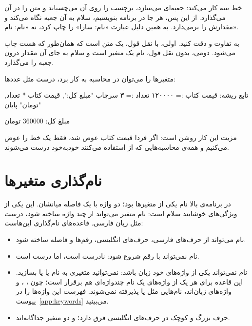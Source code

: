 خط  سه کار می‌کند: جعبه‌ای می‌سازد، برچسب
 را روی آن می‌چسباند و متن  را در آن می‌گذارد. از
این پس، هر جا در برنامه  بنویسیم، سلام به آن جعبه نگاه می‌کند و
مقدارش را برمی‌دارد. به همین دلیل  عبارت «نام:
سارا» را چاپ کرد، نه «نام: نام».

\begin{note}
به تفاوت  و  دقت کنید. اولی، با نقل قول، یک متن
است که همان‌طور که هست چاپ می‌شود. دومی، بدون نقل قول، نام یک متغیر است و
سلام به جای آن مقدار درون جعبه را می‌گذارد.
\end{note}

متغیرها را می‌توان در محاسبه به کار برد، درست مثل عددها:

\begin{salamfa}
تابع ریشه:
    قیمت کتاب := ۱۲۰۰۰۰
    تعداد := ۳
    سرچاپ "مبلغ کل:", قیمت کتاب * تعداد, "تومان"
پایان
\end{salamfa}

\begin{outputfa}
مبلغ کل: 360000 تومان
\end{outputfa}

مزیت این کار روشن است: اگر فردا قیمت کتاب عوض شد، فقط یک خط را عوض می‌کنیم
و همه‌ی محاسبه‌هایی که از  استفاده می‌کنند خودبه‌خود درست
می‌شوند.

\section{نام‌گذاری متغیرها}

در برنامه‌ی بالا نام یکی از متغیرها  بود؛ دو واژه با یک
فاصله میانشان. این یکی از ویژگی‌های خوشایند سلام است: نام متغیر می‌تواند
از چند واژه ساخته شود، درست مثل زبان فارسی. قاعده‌های نام‌گذاری این‌هاست:
\begin{itemize}
  \item نام می‌تواند از حرف‌های فارسی، حرف‌های انگلیسی، رقم‌ها و فاصله
        ساخته شود.
  \item نام نمی‌تواند با رقم شروع شود:  نادرست است، اما
         درست است.
  \item نام نمی‌تواند یکی از واژه‌های خود زبان باشد: نمی‌توانید متغیری به
        نام  یا  یا  بسازید. این قاعده
        برای هر یک از واژه‌های یک نام چندواژه‌ای هم برقرار است؛ چون
        ، ،  و  واژه‌های
        زبان‌اند، نام‌هایی مثل  یا 
        پذیرفته نمی‌شوند. فهرست این واژه‌ها را در پیوست~\ref{app:keywords}
        می‌بینید.
  \item حرف بزرگ و کوچک در حرف‌های انگلیسی فرق دارد؛  و
         دو متغیر جداگانه‌اند.
\end{itemize}


